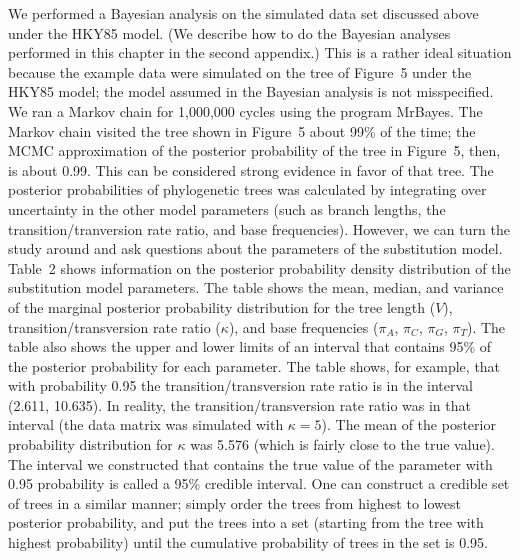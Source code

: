 \documentclass{svmult}
\begin{document}
We performed a Bayesian analysis on the simulated data set discussed above under the HKY85 model. (We describe how to do the Bayesian
analyses performed in this chapter in the second appendix.) 
This is a rather ideal situation because
the example data were simulated on the tree of Figure~5 under the HKY85 model; the model assumed in the Bayesian analysis is not misspecified.
We ran a Markov chain for 1,000,000 cycles using the program MrBayes. The Markov chain visited the tree shown in Figure~5 about 99\% of the
time; the MCMC approximation of the posterior probability of the tree in Figure~5, then, is about 0.99. This can be considered strong evidence in
favor of that tree. The posterior probabilities of phylogenetic trees was calculated by integrating over uncertainty in the other model parameters (such
as branch lengths, the transition/tranversion rate ratio, and base frequencies). However, we can turn the study around and ask questions about the
parameters of the substitution model. Table~2 shows information on the posterior probability density distribution of the substitution model parameters.
The table shows the mean, median, and variance of the marginal posterior probability distribution for the tree length ($V$), transition/transversion
rate ratio ($\kappa$), and base frequencies ($\pi_A$, $\pi_C$, $\pi_G$, $\pi_T$). The table also shows the upper and lower limits of an interval that
contains 95\% of the posterior probability for each parameter. The table shows, for example, that with probability 0.95 the transition/transversion
rate ratio is in the interval (2.611, 10.635). In reality, the transition/transversion rate ratio was in that interval (the data matrix was simulated with
$\kappa = 5$). The mean of the posterior probability distribution for $\kappa$ was 5.576 (which is fairly close to the true value). The interval we constructed
that contains the true value of the parameter with 0.95 probability is called a 95\% credible interval. One can construct a credible set of trees in a similar
manner; simply order the trees from highest to lowest posterior probability, and put the trees into a set (starting from the tree with highest probability)
until the cumulative probability of trees in the set is 0.95. 
\end{document}
